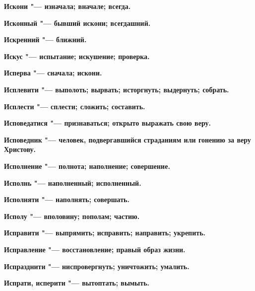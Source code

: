 \bfseries Искони \normalfont{} "--- изначала; вначале; всегда. 




\bfseries Исконный \normalfont{} "--- бывший искони; всегдашний. 




\bfseries Искренний \normalfont{} "--- ближний. 




\bfseries Искус \normalfont{} "--- испытание; искушение; проверка. 




\bfseries Исперва \normalfont{} "--- сначала; искони. 




\bfseries Исплевити \normalfont{} "--- выполоть; вырвать; исторгнуть; выдернуть; собрать. 




\bfseries Исплести \normalfont{} "--- сплести; сложить; составить. 




\bfseries Исповедатися \normalfont{} "--- признаваться; открыто выражать свою веру. 




\bfseries Исповедник \normalfont{} "--- человек, подвергавшийся страданиям или гонению за веру Христову. 




\bfseries Исполнение \normalfont{} "--- полнота; наполнение; совершение. 




\bfseries Исполнь \normalfont{} "--- наполненный; исполненный. 




\bfseries Исполняти \normalfont{} "--- наполнять; совершать. 




\bfseries Исполу \normalfont{} "--- вполовину; пополам; частию. 




\bfseries Исправити \normalfont{} "--- выпрямить; исправить; направить; укрепить. 




\bfseries Исправление \normalfont{} "--- восстановление; правый образ жизни. 




\bfseries Испразднити \normalfont{} "--- ниспровергнуть; уничтожить; умалить. 




\bfseries Испрати, исперити \normalfont{} "--- вытоптать; вымыть. 




